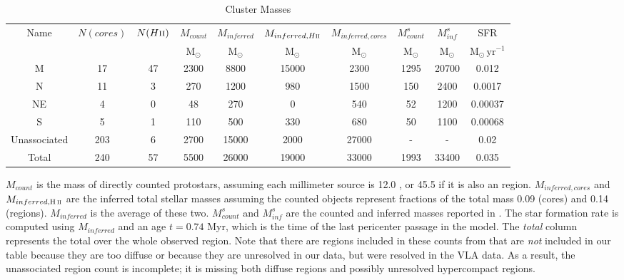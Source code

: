 \begin{table*}[htp]
\centering
\caption{Cluster Masses}
\begin{tabular}{cccccccccc}
\label{tab:clustermassestimates}
Name & $N(cores)$ & $N(H\textsc{ii})$ & $M_{count}$ & $M_{inferred}$ & $M_{inferred, H\textsc{ii}}$ & $M_{inferred, cores}$ & $M_{count}^s$ & $M_{inf}^s$ & SFR \\
 &  &  & $\mathrm{M_{\odot}}$ & $\mathrm{M_{\odot}}$ & $\mathrm{M_{\odot}}$ & $\mathrm{M_{\odot}}$ & $\mathrm{M_{\odot}}$ & $\mathrm{M_{\odot}}$ & $\mathrm{M_{\odot}\,yr^{-1}}$ \\
\hline
M & 17 & 47 & 2300 & 8800 & 15000 & 2300 & 1295 & 20700 & 0.012 \\
N & 11 & 3 & 270 & 1200 & 980 & 1500 & 150 & 2400 & 0.0017 \\
NE & 4 & 0 & 48 & 270 & 0 & 540 & 52 & 1200 & 0.00037 \\
S & 5 & 1 & 110 & 500 & 330 & 680 & 50 & 1100 & 0.00068 \\
Unassociated & 203 & 6 & 2700 & 15000 & 2000 & 27000 & - & - & 0.02 \\
Total & 240 & 57 & 5500 & 26000 & 19000 & 33000 & 1993 & 33400 & 0.035 \\
\hline
\end{tabular}
\par
$M_{count}$ is the mass of directly counted protostars, assuming each millimeter source is 12.0 \msun, or 45.5 \msun if it is also an \hii region.  $M_{inferred,cores}$ and $M_{inferred,\hii}$ are the inferred total stellar masses assuming the counted objects represent fractions of the total mass 0.09 (cores) and 0.14 (\hii regions).  $M_{inferred}$ is the average of these two.  $M_{count}^s$ and $M_{inf}^s$ are the counted and inferred masses reported in \citet{Schmiedeke2016a}.  The star formation rate is computed using $M_{inferred}$ and an age $t=0.74$ Myr, which is the time of the last pericenter passage in the \citet{Kruijssen2015a} model.  The \emph{total} column represents the total over the whole observed region.  Note that there are \hii regions included in these counts from \citet{Schmiedeke2016a} that are \emph{not} included in our table because they are too diffuse or because they are unresolved in our data, but were resolved in the \citet{De-Pree2014a} VLA data.  As a result, the unassociated \hii region count is incomplete; it is missing both diffuse \hii regions and possibly unresolved hypercompact \hii regions.
\end{table*}
